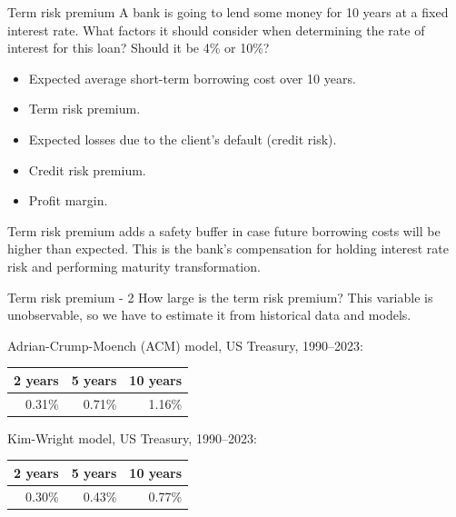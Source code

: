 \documentclass{beamer}
\begin{document}
\begin{frame}{Term risk premium}
\justify
A bank is going to lend some money for 10 years at a fixed interest rate. What factors it should consider when determining the rate of interest for this loan? Should it be 4\% or 10\%?

\begin{itemize}
\justifying
\item Expected average short-term borrowing cost over 10 years.
\item Term risk premium.
\item Expected losses due to the client's default (credit risk).
\item Credit risk premium.
\item Profit margin.
\end{itemize}

\justify
Term risk premium adds a safety buffer in case future borrowing costs will be higher than expected. This is the bank's compensation for holding interest rate risk and performing maturity transformation.
\end{frame}



\begin{frame}{Term risk premium - 2}
\justify
How large is the term risk premium? This variable is unobservable, so we have to estimate it from historical data and models.

\justify
 Adrian-Crump-Moench (ACM) model, US Treasury, 1990--2023:

\begin{tabular}{r|r|r}
2 years & 5 years & 10 years \\ \hline
0.31\% & 0.71\% & 1.16\% 
\end{tabular}

\justify
Kim-Wright model, US Treasury, 1990--2023:

\begin{tabular}{r|r|r}
2 years & 5 years & 10 years \\ \hline
0.30\% & 0.43\% & 0.77\%
\end{tabular}

\end{frame}
\end{document}
